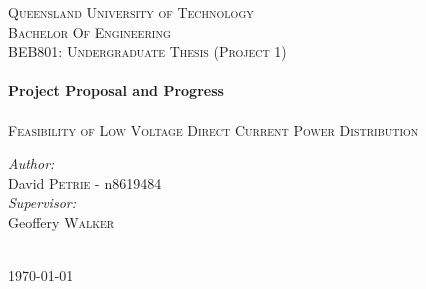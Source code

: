 \begin{titlepage}



\center %
 

\textsc{\LARGE Queensland University of Technology}\\[1.5cm] %
\textsc{\Large Bachelor Of Engineering}\\[0.5cm] %
\textsc{\large BEB801: Undergraduate Thesis (Project 1)}\\[0.5cm] %


\HRule \\[0.5cm]
{ \huge \bfseries Project Proposal and Progress}\\[0.4cm] %
\HRule \\[2cm]
 
 

\textsc{\Large Feasibility of Low Voltage Direct Current Power Distribution}\\[4cm] 


\begin{minipage}{0.4\textwidth}
\begin{center} \large
\emph{Author:}\\
David \textsc{Petrie} - n8619484 \\[1cm]
\emph{Supervisor:}\\
Geoffery \textsc{Walker}\\
\end{center}
\end{minipage}
\\[1.5cm]


{\large \today}\\[2cm] %
 

\vfill %

\end{titlepage}